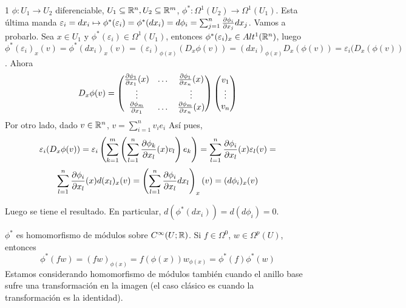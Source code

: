 \documentclass[CV.tex]{subfiles}
\begin{document}
\begin{ej}1
$\phi:U_1\to U_2$ diferenciable, $U_1\subseteq\mathbb{R}^n, U_2\subseteq\mathbb{R}^m$, $\phi^*:\Omega^1(U_2)\to \Omega^1(U_1)$. Esta última manda $\varepsilon_i=dx_i\mapsto \phi^*(\varepsilon_i)=\phi^*(dx_i)=d\phi_i=\sum_{j=1}^n\frac{\partial \phi_i}{\partial x_j}dx_j$. Vamos a probarlo. Sea $x\in U_1$ y $\phi^*(\varepsilon_i)\in\Omega^1(U_1)$, entonces $\phi^*(\varepsilon_i)_x\in Alt^1(\mathbb{R}^n)$, luego $\phi^*(\varepsilon_i)_x(v)=\phi^*(dx_i)_x(v)=(\varepsilon_i)_{\phi(x)}(D_x\phi(v))=(dx_i)_{\phi(x)}D_x(\phi(v))=\varepsilon_i(D_x(\phi(v))$. Ahora
\[
D_x\phi(v)=\begin{pmatrix}
\frac{\partial \phi_1}{\partial x_1}(x) & \dots & \frac{\partial \phi_1}{\partial x_n}(x)\\
\vdots & & \vdots \\
\frac{\partial \phi_m}{\partial x_1} & \dots & \frac{\partial \phi_m}{\partial x_n}(x)
\end{pmatrix}\begin{pmatrix}
v_1\\
\vdots\\
v_n
\end{pmatrix}
\]
Por otro lado, dado $v\in\mathbb{R}^n$, $v=\sum_{i=1}^nv_ie_i$ Así pues, 
\[
\varepsilon_i(D_x\phi(v))=\varepsilon_i\left(\sum_{k=1}^m\left(\sum_{l=1}^n\frac{\partial \phi_k}{\partial x_l}(x)v_l\right)e_k\right)=\sum_{l=1}^n\frac{\partial \phi_i}{\partial x_l}(x)\varepsilon_l(v)=
\]
\[
\sum_{l=1}^n\frac{\partial \phi_i}{\partial x_l}(x)d(x_l)_x(v)=\left(\sum_{l=1}^n\frac{\partial \phi_i}{\partial x_l}dx_l\right)_x(v)=(d\phi_i)_x(v)
\]

Luego se tiene el resultado. En particular, $d(\phi^*(dx_i))=d(d\phi_i)=0$. 
\end{ej}

\begin{nota}
$\phi^*$ es homomorfismo de módulos sobre $C^{\infty}(U;\mathbb{R})$. Si $f\in\Omega^0$, $w\in\Omega^p(U)$, entonces 
\[
\phi^*(fw)=(fw)_{\phi(x)}=f(\phi(x))w_{\phi(x)}=\phi^*(f)\phi^*(w)
\]
Estamos considerando homomorfismo de módulos también cuando el anillo base sufre una transformación en la imagen (el caso clásico es cuando la transformación es la identidad).
\end{nota}
\end{document}
